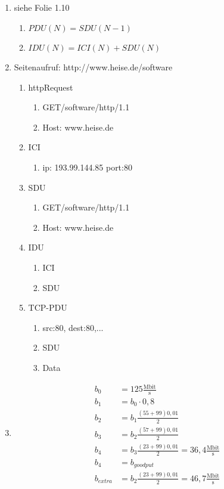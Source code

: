 \subsection{}
\begin{enumerate}
	\item siehe Folie 1.10
	\begin{enumerate}
		\item \(PDU(N)=SDU(N-1)\)
		\item \(IDU(N)=ICI(N)+SDU(N)\)
	\end{enumerate}
	\item Seitenaufruf: http://www.heise.de/software
	\begin{enumerate}
		\item httpRequest
		\begin{enumerate}
			\item  GET/software/http/1.1
			\item Host: www.heise.de
		\end{enumerate}
		\item ICI 
		\begin{enumerate}
			\item ip: 193.99.144.85 port:80
		\end{enumerate}
		\item SDU
		\begin{enumerate}
			\item  GET/software/http/1.1
			\item Host: www.heise.de
		\end{enumerate}
		\item IDU
		\begin{enumerate}
			\item ICI
			\item SDU
		\end{enumerate}
		\item TCP-PDU
		\begin{enumerate}
			\item src:80, dest:80,...
			\item SDU
			\item Data
		\end{enumerate}
	\end{enumerate}
	\item	
	\begin{align*}		
		b_{0}&=125\frac{\text{Mbit}}{\text{s}}\\
		b_{1}&=b_{0}\cdot0,8\\
		b_{2}&=b_{1}\frac{(55+99)0,01}2\\
		b_{3}&=b_{2}\frac{(57+99)0,01}2\\
		b_{4}&=b_{3}\frac{(23+99)0,01}2=36,4\frac{\text{Mbit}}							{\text{s}}\\
		b_{4}&=b_{goodput}\\
		b_{extra}&=b_{2}\frac{(23+99)0,01}2=46,7\frac{\text{Mbit}}						{\text{s}}
	\end{align*}
\end{enumerate}

